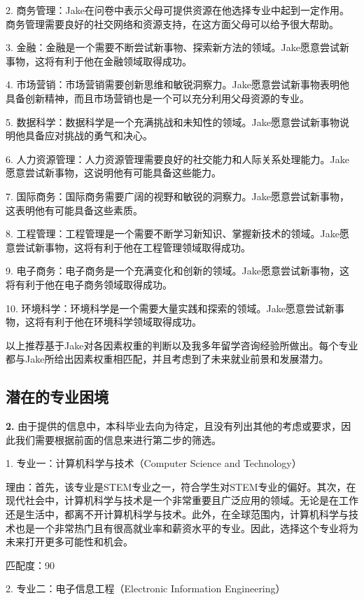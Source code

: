 \documentclass[12pt]{article}
\begin{document}
\begin{CJK*}{UTF8}{gbsn}
2. 商务管理：Jake在问卷中表示父母可提供资源在他选择专业中起到一定作用。商务管理需要良好的社交网络和资源支持，在这方面父母可以给予很大帮助。

3. 金融：金融是一个需要不断尝试新事物、探索新方法的领域。Jake愿意尝试新事物，这将有利于他在金融领域取得成功。

4. 市场营销：市场营销需要创新思维和敏锐洞察力。Jake愿意尝试新事物表明他具备创新精神，而且市场营销也是一个可以充分利用父母资源的专业。

5. 数据科学：数据科学是一个充满挑战和未知性的领域。Jake愿意尝试新事物说明他具备应对挑战的勇气和决心。

6. 人力资源管理：人力资源管理需要良好的社交能力和人际关系处理能力。Jake愿意尝试新事物，这说明他有可能具备这些能力。

7. 国际商务：国际商务需要广阔的视野和敏锐的洞察力。Jake愿意尝试新事物，这表明他有可能具备这些素质。

8. 工程管理：工程管理是一个需要不断学习新知识、掌握新技术的领域。Jake愿意尝试新事物，这将有利于他在工程管理领域取得成功。

9. 电子商务：电子商务是一个充满变化和创新的领域。Jake愿意尝试新事物，这将有利于他在电子商务领域取得成功。

10. 环境科学：环境科学是一个需要大量实践和探索的领域。Jake愿意尝试新事物，这将有利于他在环境科学领域取得成功。

以上推荐基于Jake对各因素权重的判断以及我多年留学咨询经验所做出。每个专业都与Jake所给出因素权重相匹配，并且考虑到了未来就业前景和发展潜力。


   \newpage
   \subsection*{潜在的专业困境}\textbf{2.} 由于提供的信息中，本科毕业去向为待定，且没有列出其他的考虑或要求，因此我们需要根据前面的信息来进行第二步的筛选。

1. 专业一：计算机科学与技术（Computer Science and Technology）

理由：首先，该专业是STEM专业之一，符合学生对STEM专业的偏好。其次，在现代社会中，计算机科学与技术是一个非常重要且广泛应用的领域。无论是在工作还是生活中，都离不开计算机科学与技术。此外，在全球范围内，计算机科学与技术也是一个非常热门且有很高就业率和薪资水平的专业。因此，选择这个专业将为未来打开更多可能性和机会。

匹配度：90

2. 专业二：电子信息工程（Electronic Information Engineering）


\end{CJK*}
\end{document}
